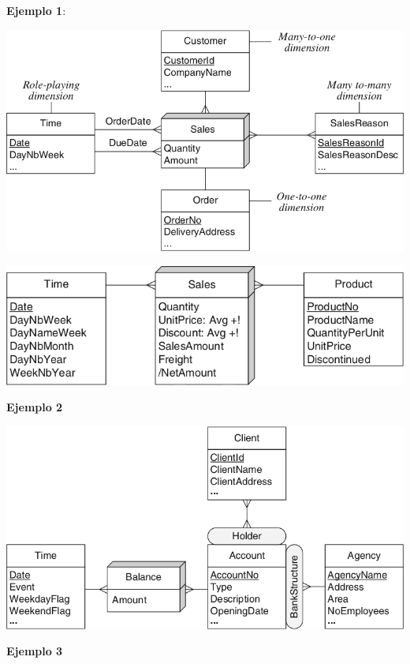 \documentclass{fancyslides}
\begin{document}
\begin{frame}
\misc
{ \textbf{Ejemplo 1}:

\begin{center}
\includegraphics[scale=0.3]{diseno3}
\end{center}
}
\end{frame}

\begin{frame}
\misc
{ 
\begin{center}
\includegraphics[scale=0.24]{diseno4}

\textbf{Ejemplo 2}
\vspace{2mm}

\includegraphics[scale=0.2]{diseno5}

\textbf{Ejemplo 3}
\end{center}
}
\end{frame}
\end{document}
